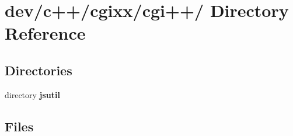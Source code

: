 \section{dev/c++/cgixx/cgi++/ Directory Reference}
\label{dir_e289bca861bb9a59ce9e4bdcc5fe9faa}
\subsection*{Directories}
\begin{CompactItemize}
\item 
directory {\bf jsutil}
\end{CompactItemize}
\subsection*{Files}
